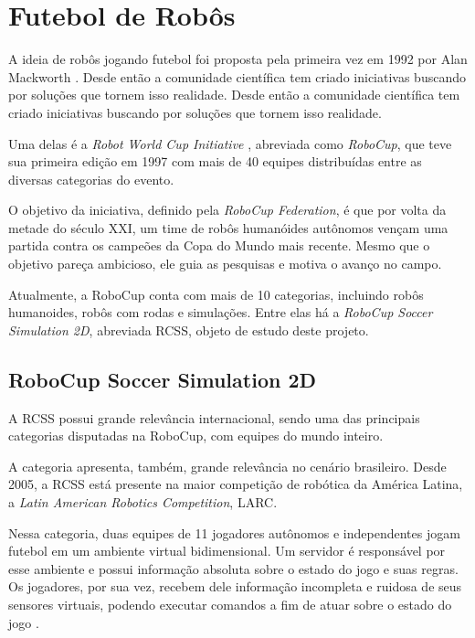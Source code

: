 \section{Futebol de Robôs}
\par A ideia de robôs jogando futebol foi proposta pela primeira vez em 1992 por Alan Mackworth \cite{mackworth1993seeing}. Desde então a comunidade científica tem criado iniciativas buscando por soluções que tornem isso realidade. Desde então a comunidade científica tem criado iniciativas buscando por soluções que tornem isso realidade.
\par Uma delas é a \textit{Robot World Cup Initiative} \cite{robocup-initiative}, abreviada como \textit{RoboCup}, que teve sua primeira edição em 1997 com mais de 40 equipes distribuídas entre as diversas categorias do evento.
\par O objetivo da iniciativa, definido pela \textit{RoboCup Federation}, é que por volta da metade do século XXI, um time de robôs humanóides autônomos vençam uma partida contra os campeões da Copa do Mundo mais recente. Mesmo que o objetivo pareça ambicioso, ele guia as pesquisas e motiva o avanço no campo.
\par Atualmente, a RoboCup conta com mais de 10 categorias, incluindo robôs humanoides, robôs com rodas e simulações. Entre elas há a \textit{RoboCup Soccer Simulation 2D}, abreviada RCSS, objeto de estudo deste projeto.

\subsection{RoboCup Soccer Simulation 2D}
\par A RCSS possui grande relevância internacional, sendo uma das principais categorias disputadas na RoboCup, com equipes do mundo inteiro.
\par A categoria apresenta, também, grande relevância no cenário brasileiro.
Desde 2005, a RCSS está presente na maior competição de robótica da América Latina, a \textit{Latin American Robotics Competition}, LARC.
\par Nessa categoria, duas equipes de 11 jogadores autônomos e independentes jogam futebol em um ambiente virtual bidimensional. Um servidor é responsável por esse ambiente e possui informação absoluta sobre o estado do jogo e suas regras. Os jogadores, por sua vez, recebem dele informação incompleta e ruidosa de seus sensores virtuais, podendo executar comandos a fim de atuar sobre o estado do jogo \cite{rcssmanual2003}.

